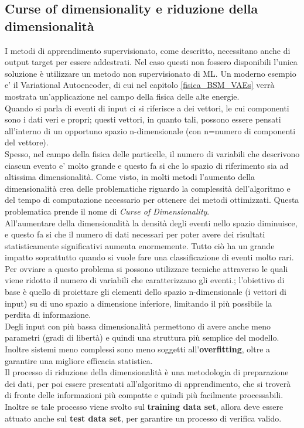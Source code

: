 \newpage


\subsection{Curse of dimensionality e riduzione della dimensionalità}
\label{curse_dim}

I metodi di apprendimento supervisionato, come descritto, necessitano anche di output target per essere addestrati. Nel caso questi non fossero disponibili l'unica soluzione è utilizzare un metodo non supervisionato di ML. Un moderno esempio e' il Variational Autoencoder, di cui nel capitolo \ref{fisica_BSM_VAEs} verrà mostrata un'applicazione nel campo della fisica delle alte energie. \\
Quando si parla di eventi di input ci si riferisce a dei vettori, le cui componenti sono i dati veri e propri; questi vettori, in quanto tali, possono essere pensati all'interno di un opportuno spazio n-dimensionale (con n=numero di componenti del vettore).\\
Spesso, nel campo della fisica delle particelle, il numero di variabili che descrivono ciascun evento e' molto grande e  questo fa si che lo spazio di riferimento sia ad altissima dimensionalità. Come visto, in molti metodi l'aumento della dimensionalità crea delle problematiche riguardo la complessità dell'algoritmo e del tempo di computazione necessario per ottenere dei metodi ottimizzati. Questa problematica prende il nome di \textit{Curse of Dimensionality}. \\
All'aumentare della dimensionalità la densità degli eventi nello spazio diminuisce, e questo fa si che il numero di dati necessari per poter avere dei risultati statisticamente significativi aumenta enormemente. Tutto ciò ha un grande impatto soprattutto quando si vuole fare una classificazione di eventi molto rari.\\
Per ovviare a questo problema si possono utilizzare tecniche attraverso le quali viene ridotto il numero di variabili che caratterizzano gli eventi.; l'obiettivo di base è quello di proiettare gli elementi dello spazio n-dimensionale (i vettori di input) su di uno spazio a dimensione inferiore, limitando il più possibile la perdita di informazione.\\
Degli input con più bassa dimensionalità permettono di avere anche meno parametri (gradi di libertà) e quindi una struttura più semplice del modello. Inoltre sistemi meno complessi sono meno soggetti all'\textbf{overfitting}, oltre a garantire una migliore efficacia statistica. \\
Il processo di riduzione della dimensionalità è una metodologia di preparazione dei dati, per poi essere presentati all'algoritmo di apprendimento, che si troverà di fronte delle informazioni più compatte e quindi più facilmente processabili. Inoltre se tale processo viene svolto sul \textbf{training data set}, allora deve essere attuato anche sul \textbf{test data set}, per garantire un processo di verifica valido.

